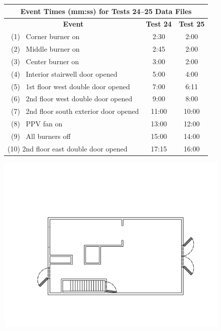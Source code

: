 \documentclass[12pt,oneside]{book}
\begin{document}
\begin{figure}[!ht]
\begin{minipage}[b]{0.8\columnwidth}
	\begin{flushleft}
	\small
	\begin{tabular}{lcc}
	\multicolumn{3}{c}{Event Times (mm:ss) for Tests 24--25 Data Files} \\
	\toprule
	\multicolumn{1}{c}{\textbf{Event}} 			& \textbf{Test 24}	& \textbf{Test 25} \\
	\midrule
	~(1)~ Corner burner on 						& 	2:30 			&	 2:00		\\
	~(2)~ Middle burner on 						&   2:45	  		&	 2:00		\\
	~(3)~ Center burner on 						&   3:00	  		&	 2:00		\\
	~(4)~ Interior stairwell door opened 		&   5:00	  		&    4:00		\\
	~(5)~ 1st floor west double door opened 	&	7:00	  		&    6:11 	 	\\
	~(6)~ 2nd floor west double door opened 	&   9:00		  	&    8:00		\\
	~(7)~ 2nd floor south exterior door opened	&   11:00		  	&    10:00		\\
	~(8)~ PPV fan on 							&   13:00		  	&    12:00 		\\
	~(9)~ All burners off 						&   15:00		  	&    14:00		\\
	(10) 2nd floor east double door opened 		&   17:15		  	&    16:00		\\
	\bottomrule
	\end{tabular}
	\end{flushleft}
\end{minipage}
\begin{minipage}[b]{0.9\columnwidth}
	\vspace{15pt}
	\centering
	\includegraphics[width=0.94\columnwidth]{../Figures/Floor_Plans/West_Structure_2nd_Floor_Test_24}

\end{minipage}
\end{figure}
\end{document}
